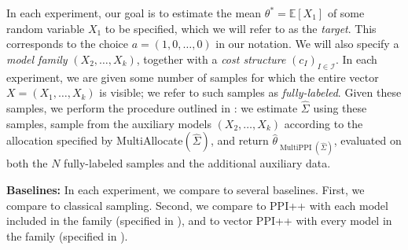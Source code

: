 \documentclass{article} %
\newcommand{\charlie}[1]{ {\color{red}[CCB: #1]}}
\DeclareMathOperator{\multiPPI}{MultiPPI}
\begin{document}



In each experiment, our goal is to estimate the mean $\theta^*=\mathbb{E}[X_1]$ of some random variable $X_1$ to be specified, which we will refer to as the \textit{target}. This corresponds to the choice $a=(1,0,\dots,0)$ in our notation. We will also specify a \textit{model family} $(X_2,\dots,X_k)$, together with a \textit{cost structure} $(c_I)_{I\in\mathcal{I}}$.
%
In each experiment, we are given some number of samples for which the entire vector $X=(X_1,\dots,X_k)$ is visible; we refer to such samples as \textit{fully-labeled}. Given these samples, we perform the procedure outlined in : we estimate $\widehat{\Sigma}$ using these samples, sample from the auxiliary models $(X_2, \ldots, X_k)$ according to the allocation  specified by MultiAllocate$(\widehat{\Sigma})$, and return $\hat{\theta}_{\multiPPI(\widehat{\Sigma})}$, evaluated on both the $N$ fully-labeled samples and the additional auxiliary data.

\textbf{Baselines:} In each experiment, we compare to several baselines. First, we compare to classical sampling. Second, we compare to PPI++ with each model included in the family (specified in ), and to vector PPI++ with every model in the family (specified in ). %
\end{document}

